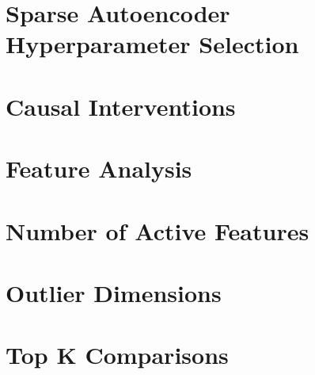 \documentclass[12pt]{article}
\begin{document}
\appendix

\section{Sparse Autoencoder Hyperparameter Selection}






\section{Causal Interventions}



\section{Feature Analysis}
\label{appendix:feature_interp_examples}


\section{Number of Active Features}
\label{appendix:n_features_active}


\section{Outlier Dimensions}
\label{appendix:outlier_dimensions}



\section{Top K Comparisons}
\label{appendix:topk}





% 

\end{document}
